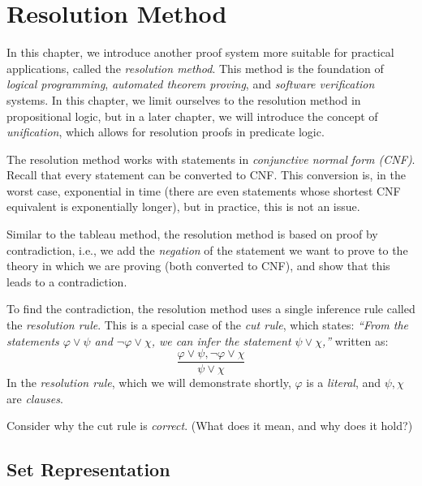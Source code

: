 \chapter{Resolution Method}\label{chapter:propositional-resolution}

In this chapter, we introduce another proof system more suitable for practical applications, called the \emph{resolution method}. This method is the foundation of \emph{logical programming}, \emph{automated theorem proving}, and \emph{software verification} systems. In this chapter, we limit ourselves to the resolution method in propositional logic, but in a later chapter, we will introduce the concept of \emph{unification}, which allows for resolution proofs in predicate logic.

The resolution method works with statements in \emph{conjunctive normal form (CNF)}. Recall that every statement can be converted to CNF. This conversion is, in the worst case, exponential in time (there are even statements whose shortest CNF equivalent is exponentially longer), but in practice, this is not an issue.

Similar to the tableau method, the resolution method is based on proof by contradiction, i.e., we add the \emph{negation} of the statement we want to prove to the theory in which we are proving (both converted to CNF), and show that this leads to a contradiction.

To find the contradiction, the resolution method uses a single inference rule called the \emph{resolution rule}. This is a special case of the \emph{cut rule}, which states: \emph{``From the statements $\varphi \lor \psi$ and $\neg \varphi \lor \chi$, we can infer the statement $\psi \lor \chi$,''} written as:
$$
\frac{\varphi \lor \psi, \neg \varphi \lor \chi}{\psi \lor \chi}
$$
In the \emph{resolution rule}, which we will demonstrate shortly, $\varphi$ is a \emph{literal}, and $\psi, \chi$ are \emph{clauses}.

\begin{exercise}
Consider why the cut rule is \emph{correct}. (What does it mean, and why does it hold?)
\end{exercise}

\section{Set Representation}


